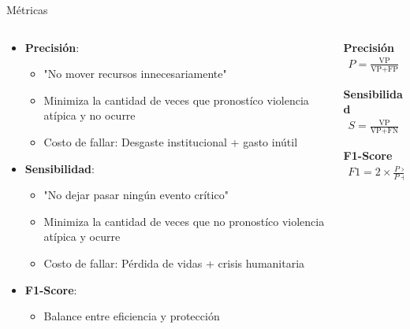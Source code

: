 \begin{frame}{Métricas}
    \begin{columns}[T]
        \begin{column}{0.6\textwidth}
            \begin{itemize}
            \pause
                \item \textbf{Precisión}:
                \begin{itemize}
                    \item "No mover recursos innecesariamente"
                    \item Minimiza la cantidad de veces que pronostíco violencia atípica y no ocurre
                    \item \alert{Costo de fallar}: Desgaste institucional + gasto inútil
                \end{itemize}
                \pause
                \item \textbf{Sensibilidad}:
                \begin{itemize}
                    \item "No dejar pasar ningún evento crítico"
                    \item Minimiza la cantidad de veces que no pronostíco violencia atípica y ocurre
                    \item \alert{Costo de fallar}: Pérdida de vidas + crisis humanitaria
                \end{itemize}
                \pause
                \item \textbf{F1-Score}:
                \begin{itemize}
                    \item Balance entre eficiencia y protección
                \end{itemize}
            \end{itemize}
        \end{column}
        \pause
        \begin{column}{0.4\textwidth}
            \centering

            \textbf{Precisión}
            \begin{align*}
                P = \frac{\text{VP}}{\text{VP} + \text{FP}}
            \end{align*}

            
            \textbf{Sensibilidad}
            \begin{align*}
                S = \frac{\text{VP}}{\text{VP} + \text{FN}}
            \end{align*}

            
            \textbf{F1-Score}
            \begin{align*}
                F1 = 2 \times \frac{P \times S}{P + S}
            \end{align*}
        \end{column}
    \end{columns}
\end{frame}